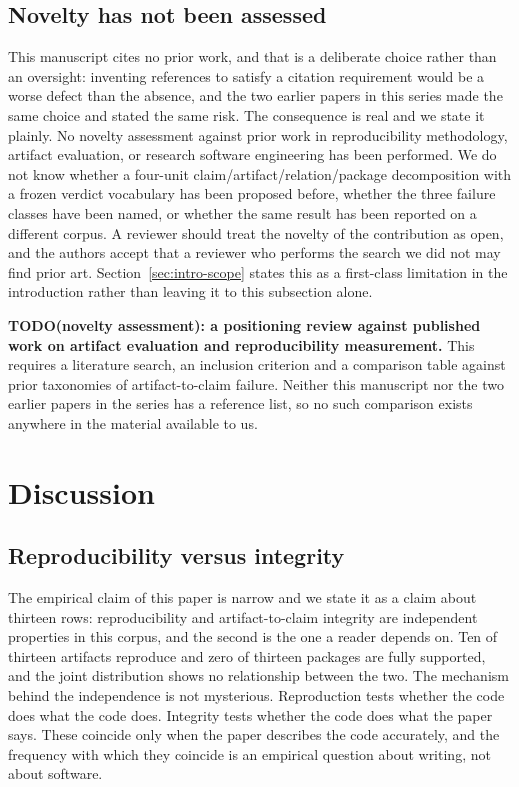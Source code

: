 \documentclass[sigconf,review]{acmart}
\begin{document}
\subsection{Novelty has not been assessed}
\label{sec:threat-novelty}

This manuscript cites no prior work, and that is a deliberate choice rather
than an oversight: inventing references to satisfy a citation requirement would
be a worse defect than the absence, and the two earlier papers in this series
made the same choice and stated the same risk. The consequence is real and we
state it plainly. No novelty assessment against prior work in
reproducibility methodology, artifact evaluation, or research software
engineering has been performed. We do not know whether a four-unit
claim/artifact/relation/package decomposition with a frozen verdict vocabulary
has been proposed before, whether the three failure classes have been named,
or whether the same result has been reported on a different corpus. A reviewer
should treat the novelty of the contribution as open, and the authors accept
that a reviewer who performs the search we did not may find prior art.
Section~\ref{sec:intro-scope} states this as a first-class limitation in the
introduction rather than leaving it to this subsection alone.

\textbf{TODO(novelty assessment): a positioning review against published work
on artifact evaluation and reproducibility measurement.} This requires a
literature search, an inclusion criterion and a comparison table against
prior taxonomies of artifact-to-claim failure. Neither this manuscript nor the
two earlier papers in the series has a reference list, so no such comparison
exists anywhere in the material available to us.

\section{Discussion}
\label{sec:discussion}

\subsection{Reproducibility versus integrity}
\label{sec:disc-repro}

The empirical claim of this paper is narrow and we state it as a claim about
thirteen rows: reproducibility and artifact-to-claim integrity are
independent properties in this corpus, and the second is the one a reader
depends on. Ten of thirteen artifacts reproduce and zero of thirteen packages
are fully supported, and the joint distribution shows no relationship between
the two. The mechanism behind the independence is not mysterious. Reproduction
tests whether the code does what the code does. Integrity tests whether the
code does what the paper says. These coincide only when the paper describes
the code accurately, and the frequency with which they coincide is an empirical
question about writing, not about software.
\end{document}
